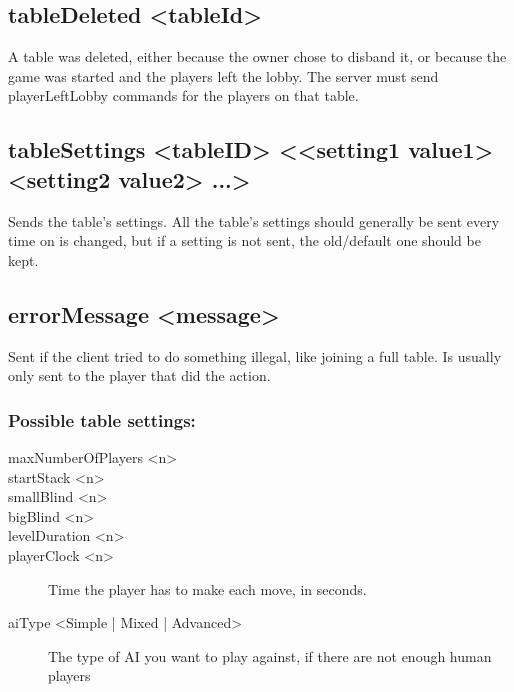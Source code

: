 \documentclass{article}
\begin{document}
\subsection*{tableDeleted <tableId>}
A table was deleted, either because the owner chose to disband it, or because the game was started and the players left the lobby. The server must send playerLeftLobby commands for the players on that table.

\subsection*{tableSettings <tableID> <{}<setting1 value1> <setting2 value2> ...>}
Sends the table's settings. All the table's settings should generally be sent every time on is changed, but if a setting is not sent, the old/default one should be kept.

\subsection*{errorMessage <message>}
Sent if the client tried to do something illegal, like joining a full table. Is usually only sent to the player that did the action.

\subsubsection*{Possible table settings:}
\begin{description}
\item[maxNumberOfPlayers <n>]
\item[startStack <n>]
\item[smallBlind <n>]
\item[bigBlind <n>]
\item[levelDuration <n>]
\item[playerClock <n>] Time the player has to make each move, in seconds.
\item[aiType <Simple | Mixed | Advanced>] The type of AI you want to play against, if there are not enough human players
\end{description}
\end{document}
